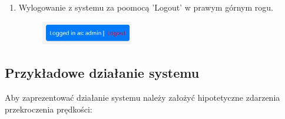 \documentclass[12pt,a4paper,oneside]{article}
\theoremstyle{definition}
\numberwithin{equation}{section}
\begin{document}
\begin{enumerate}
  \item Wylogowanie z systemu za poomocą 'Logout' w prawym górnym rogu.
        \begin{figure}[H]
          \centering
          \includegraphics[width=4cm]{dokumentacja_uzytkowa/images/logout.JPG}
          \label{fig:Wylogowanie}
        \end{figure}  
\end{enumerate}








\subsection{Przykładowe działanie systemu}
Aby zaprezentować działanie systemu należy założyć hipotetyczne zdarzenia przekroczenia prędkości:
\end{document}

